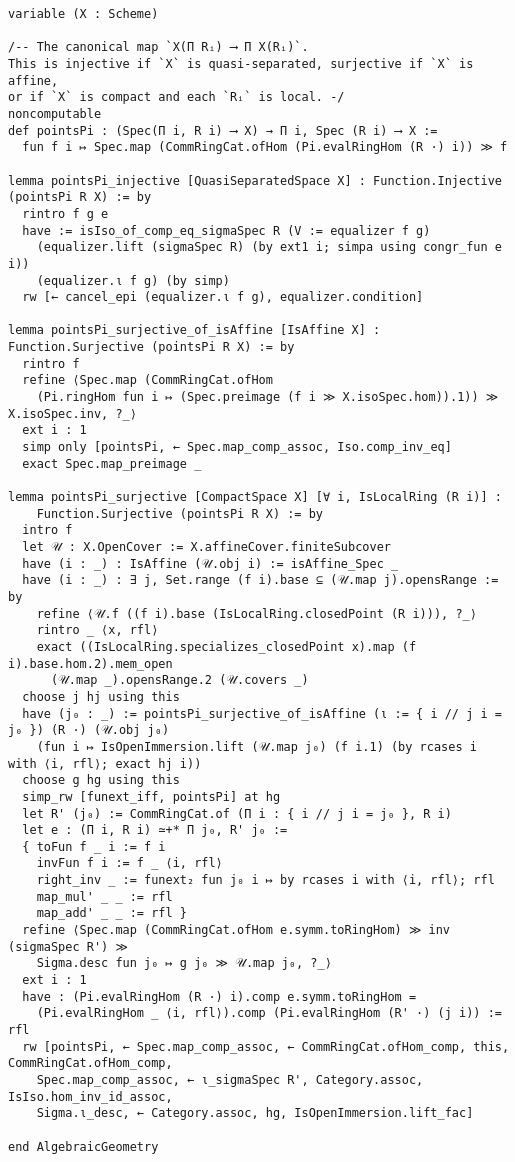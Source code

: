 \documentclass{article}
\begin{document}
\begin{lstlisting}[language=Lean, caption={PointsPi.lean}]
variable (X : Scheme)

/-- The canonical map `X(Π Rᵢ) ⟶ Π X(Rᵢ)`.
This is injective if `X` is quasi-separated, surjective if `X` is affine,
or if `X` is compact and each `Rᵢ` is local. -/
noncomputable
def pointsPi : (Spec(Π i, R i) ⟶ X) → Π i, Spec (R i) ⟶ X :=
  fun f i ↦ Spec.map (CommRingCat.ofHom (Pi.evalRingHom (R ·) i)) ≫ f

lemma pointsPi_injective [QuasiSeparatedSpace X] : Function.Injective (pointsPi R X) := by
  rintro f g e
  have := isIso_of_comp_eq_sigmaSpec R (V := equalizer f g)
    (equalizer.lift (sigmaSpec R) (by ext1 i; simpa using congr_fun e i))
    (equalizer.ι f g) (by simp)
  rw [← cancel_epi (equalizer.ι f g), equalizer.condition]

lemma pointsPi_surjective_of_isAffine [IsAffine X] : Function.Surjective (pointsPi R X) := by
  rintro f
  refine ⟨Spec.map (CommRingCat.ofHom
    (Pi.ringHom fun i ↦ (Spec.preimage (f i ≫ X.isoSpec.hom)).1)) ≫ X.isoSpec.inv, ?_⟩
  ext i : 1
  simp only [pointsPi, ← Spec.map_comp_assoc, Iso.comp_inv_eq]
  exact Spec.map_preimage _

lemma pointsPi_surjective [CompactSpace X] [∀ i, IsLocalRing (R i)] :
    Function.Surjective (pointsPi R X) := by
  intro f
  let 𝒰 : X.OpenCover := X.affineCover.finiteSubcover
  have (i : _) : IsAffine (𝒰.obj i) := isAffine_Spec _
  have (i : _) : ∃ j, Set.range (f i).base ⊆ (𝒰.map j).opensRange := by
    refine ⟨𝒰.f ((f i).base (IsLocalRing.closedPoint (R i))), ?_⟩
    rintro _ ⟨x, rfl⟩
    exact ((IsLocalRing.specializes_closedPoint x).map (f i).base.hom.2).mem_open
      (𝒰.map _).opensRange.2 (𝒰.covers _)
  choose j hj using this
  have (j₀ : _) := pointsPi_surjective_of_isAffine (ι := { i // j i = j₀ }) (R ·) (𝒰.obj j₀)
    (fun i ↦ IsOpenImmersion.lift (𝒰.map j₀) (f i.1) (by rcases i with ⟨i, rfl⟩; exact hj i))
  choose g hg using this
  simp_rw [funext_iff, pointsPi] at hg
  let R' (j₀) := CommRingCat.of (Π i : { i // j i = j₀ }, R i)
  let e : (Π i, R i) ≃+* Π j₀, R' j₀ :=
  { toFun f _ i := f i
    invFun f i := f _ ⟨i, rfl⟩
    right_inv _ := funext₂ fun j₀ i ↦ by rcases i with ⟨i, rfl⟩; rfl
    map_mul' _ _ := rfl
    map_add' _ _ := rfl }
  refine ⟨Spec.map (CommRingCat.ofHom e.symm.toRingHom) ≫ inv (sigmaSpec R') ≫
    Sigma.desc fun j₀ ↦ g j₀ ≫ 𝒰.map j₀, ?_⟩
  ext i : 1
  have : (Pi.evalRingHom (R ·) i).comp e.symm.toRingHom =
    (Pi.evalRingHom _ ⟨i, rfl⟩).comp (Pi.evalRingHom (R' ·) (j i)) := rfl
  rw [pointsPi, ← Spec.map_comp_assoc, ← CommRingCat.ofHom_comp, this, CommRingCat.ofHom_comp,
    Spec.map_comp_assoc, ← ι_sigmaSpec R', Category.assoc, IsIso.hom_inv_id_assoc,
    Sigma.ι_desc, ← Category.assoc, hg, IsOpenImmersion.lift_fac]

end AlgebraicGeometry

\end{lstlisting}
\end{document}

